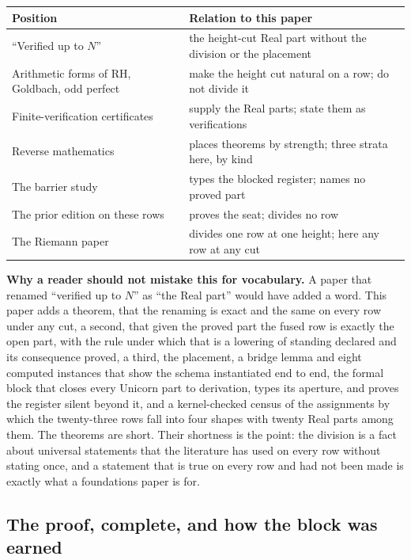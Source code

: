 \documentclass[10pt]{article}
\begin{document}
\begin{table}[!h]
\centering\scriptsize
\renewcommand{\arraystretch}{1.15}
\begin{tabularx}{\columnwidth}{@{}P{0.27\columnwidth} L@{}}
\toprule
\textbf{Position} & \textbf{Relation to this paper} \\
\midrule
``Verified up to $N$'' & the height-cut Real part without the division or the placement \\
Arithmetic forms of RH, Goldbach, odd perfect & make the height cut natural on a row; do not divide it \\
Finite-verification certificates & supply the Real parts; state them as verifications \\
Reverse mathematics & places theorems by strength; three strata here, by kind \\
The barrier study & types the blocked register; names no proved part \\
The prior edition on these rows & proves the seat; divides no row \\
The Riemann paper & divides one row at one height; here any row at any cut \\
\bottomrule
\end{tabularx}
\end{table}

\textbf{Why a reader should not mistake this for vocabulary.} A paper
that renamed ``verified up to \(N\)'' as ``the Real part'' would have
added a word. This paper adds a theorem, that the renaming is exact and
the same on every row under any cut, a second, that given the proved
part the fused row is exactly the open part, with the rule under which
that is a lowering of standing declared and its consequence proved, a
third, the placement, a bridge lemma and eight computed instances that
show the schema instantiated end to end, the formal block that closes
every Unicorn part to derivation, types its aperture, and proves the
register silent beyond it, and a kernel-checked census of the
assignments by which the twenty-three rows fall into four shapes with
twenty Real parts among them. The theorems are short. Their shortness is
the point: the division is a fact about universal statements that the
literature has used on every row without stating once, and a statement
that is true on every row and had not been made is exactly what a
foundations paper is for.

\hypertarget{the-proof-complete-and-how-the-block-was-earned}{%
\subsection{The proof, complete, and how the block was
earned}\label{the-proof-complete-and-how-the-block-was-earned}}
\end{document}
